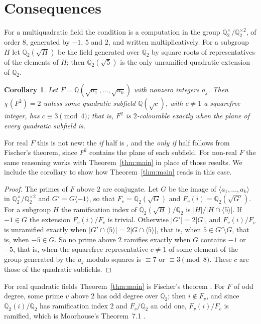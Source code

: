 \documentclass[11pt,a4paper]{amsart}
\newtheorem{corollary}[theorem]{Corollary}
\theoremstyle{definition}
\newcommand{\Q}{\mathbb{Q}}
\begin{document}
\section{Consequences}\label{sec:cor}

For a multiquadratic field the condition is a computation in the group $\Q_2^\times/\Q_2^{\times2}$, of order
$8$, generated by $-1$, $5$ and $2$, and written multiplicatively. For a subgroup $H$ let $\Q_2(\sqrt H)$ be the
field generated over $\Q_2$ by square roots of representatives of the elements of $H$; then $\Q_2(\sqrt5)$ is the
only unramified quadratic extension of $\Q_2$.

\begin{corollary}\label{cor:multi}
Let $F=\Q(\sqrt{a_1},\dots,\sqrt{a_k})$ with nonzero integers $a_j$. Then $\chi(F^2)=2$ unless some quadratic
subfield $\Q(\sqrt c)$, with $c\neq1$ a squarefree integer, has $c\equiv3\pmod4$; that is, $F^2$ is
$2$-colourable exactly when the plane of every quadratic subfield is.
\end{corollary}

For real $F$ this is not new: the \emph{if} half is \cite[Corollary~B]{MM}, and the \emph{only if} half follows
from Fischer's theorem, since $F^2$ contains the plane of each subfield. For non-real $F$ the same reasoning works
with Theorem~\ref{thm:main} in place of those results. We include the corollary to show how Theorem~\ref{thm:main}
reads in this case.

\begin{proof}
The primes of $F$ above $2$ are conjugate. Let $G$ be the image of $\langle a_1,\dots,a_k\rangle$ in
$\Q_2^\times/\Q_2^{\times2}$ and $G'=G\langle-1\rangle$, so that $F_v=\Q_2(\sqrt G)$ and $F_v(i)=\Q_2(\sqrt{G'})$.
For a subgroup $H$ the ramification index of $\Q_2(\sqrt H)/\Q_2$ is $|H|/|H\cap\langle5\rangle|$. If $-1\in G$ the
extension $F_v(i)/F_v$ is trivial. Otherwise $|G'|=2|G|$, and $F_v(i)/F_v$ is unramified exactly when
$|G'\cap\langle5\rangle|=2|G\cap\langle5\rangle|$, that is, when $5\in G'\setminus G$, that is, when $-5\in G$. So
no prime above $2$ ramifies exactly when $G$ contains $-1$ or $-5$, that is, when the squarefree representative
$c\neq1$ of some element of the group generated by the $a_j$ modulo squares is $\equiv7$ or $\equiv3\pmod8$.
These $c$ are those of the quadratic subfields.
\end{proof}

For real quadratic fields Theorem~\ref{thm:main} is Fischer's theorem \cite[Theorem~8]{Fischer1990}. For $F$ of odd
degree, some prime $v$ above $2$ has odd degree over $\Q_2$; then $i\notin F_v$, and since $\Q_2(i)/\Q_2$ has
ramification index $2$ and $F_v/\Q_2$ an odd one, $F_v(i)/F_v$ is ramified, which is Moorhouse's Theorem~7.1
\cite{Moorhouse}.
\end{document}
